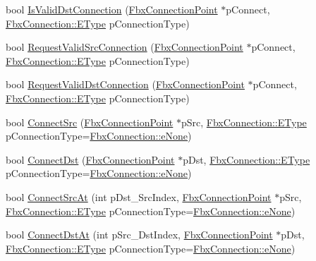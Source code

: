 \begin{DoxyCompactItemize}
\item 
bool \hyperlink{class_fbx_connection_point_a29090e1e331e55a1cf68c5c742dfd771}{Is\+Valid\+Dst\+Connection} (\hyperlink{class_fbx_connection_point}{Fbx\+Connection\+Point} $\ast$p\+Connect, \hyperlink{class_fbx_connection_a3df448a5db356652ab99fd2be2553749}{Fbx\+Connection\+::\+E\+Type} p\+Connection\+Type)
\item 
bool \hyperlink{class_fbx_connection_point_ada52c319af35d52a72af8038e0040c36}{Request\+Valid\+Src\+Connection} (\hyperlink{class_fbx_connection_point}{Fbx\+Connection\+Point} $\ast$p\+Connect, \hyperlink{class_fbx_connection_a3df448a5db356652ab99fd2be2553749}{Fbx\+Connection\+::\+E\+Type} p\+Connection\+Type)
\item 
bool \hyperlink{class_fbx_connection_point_a4c231f5b089de01510b94cdbd8036e46}{Request\+Valid\+Dst\+Connection} (\hyperlink{class_fbx_connection_point}{Fbx\+Connection\+Point} $\ast$p\+Connect, \hyperlink{class_fbx_connection_a3df448a5db356652ab99fd2be2553749}{Fbx\+Connection\+::\+E\+Type} p\+Connection\+Type)
\item 
bool \hyperlink{class_fbx_connection_point_aaae11491b7cd90fbbf9075f98f594e56}{Connect\+Src} (\hyperlink{class_fbx_connection_point}{Fbx\+Connection\+Point} $\ast$p\+Src, \hyperlink{class_fbx_connection_a3df448a5db356652ab99fd2be2553749}{Fbx\+Connection\+::\+E\+Type} p\+Connection\+Type=\hyperlink{class_fbx_connection_a3df448a5db356652ab99fd2be2553749a47aa04870c3c0769263e3972e67e9ebe}{Fbx\+Connection\+::e\+None})
\item 
bool \hyperlink{class_fbx_connection_point_a1cc755165b835c7ae2b5f4073477cef0}{Connect\+Dst} (\hyperlink{class_fbx_connection_point}{Fbx\+Connection\+Point} $\ast$p\+Dst, \hyperlink{class_fbx_connection_a3df448a5db356652ab99fd2be2553749}{Fbx\+Connection\+::\+E\+Type} p\+Connection\+Type=\hyperlink{class_fbx_connection_a3df448a5db356652ab99fd2be2553749a47aa04870c3c0769263e3972e67e9ebe}{Fbx\+Connection\+::e\+None})
\item 
bool \hyperlink{class_fbx_connection_point_a51d906d43b8596a3cf021ff2a37a35c3}{Connect\+Src\+At} (int p\+Dst\+\_\+\+Src\+Index, \hyperlink{class_fbx_connection_point}{Fbx\+Connection\+Point} $\ast$p\+Src, \hyperlink{class_fbx_connection_a3df448a5db356652ab99fd2be2553749}{Fbx\+Connection\+::\+E\+Type} p\+Connection\+Type=\hyperlink{class_fbx_connection_a3df448a5db356652ab99fd2be2553749a47aa04870c3c0769263e3972e67e9ebe}{Fbx\+Connection\+::e\+None})
\item 
bool \hyperlink{class_fbx_connection_point_a9ae5fee9358b0d3b107ea9dbd4447e81}{Connect\+Dst\+At} (int p\+Src\+\_\+\+Dst\+Index, \hyperlink{class_fbx_connection_point}{Fbx\+Connection\+Point} $\ast$p\+Dst, \hyperlink{class_fbx_connection_a3df448a5db356652ab99fd2be2553749}{Fbx\+Connection\+::\+E\+Type} p\+Connection\+Type=\hyperlink{class_fbx_connection_a3df448a5db356652ab99fd2be2553749a47aa04870c3c0769263e3972e67e9ebe}{Fbx\+Connection\+::e\+None})

\end{DoxyCompactItemize}
